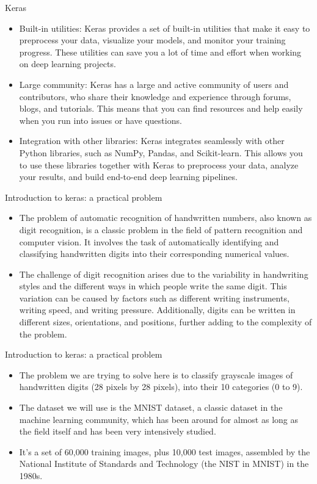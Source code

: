 \documentclass[11pt]{beamer}
\begin{document}
\begin{frame}{Keras}
\begin{itemize}
\item Built-in utilities: Keras provides a set of built-in utilities that make it easy to preprocess your data, visualize your models, and monitor your training progress. These utilities can save you a lot of time and effort when working on deep learning projects.

\item Large community: Keras has a large and active community of users and contributors, who share their knowledge and experience through forums, blogs, and tutorials. This means that you can find resources and help easily when you run into issues or have questions.

\item Integration with other libraries: Keras integrates seamlessly with other Python libraries, such as NumPy, Pandas, and Scikit-learn. This allows you to use these libraries together with Keras to preprocess your data, analyze your results, and build end-to-end deep learning pipelines.
\end{itemize}
\end{frame}
\begin{frame}{Introduction to keras: a practical problem}
\begin{itemize}
\item The problem of automatic recognition of handwritten numbers, also known as digit recognition, is a classic problem in the field of pattern recognition and computer vision. It involves the task of automatically identifying and classifying handwritten digits into their corresponding numerical values.
\item The challenge of digit recognition arises due to the variability in handwriting styles and the different ways in which people write the same digit. This variation can be caused by factors such as different writing instruments, writing speed, and writing pressure. Additionally, digits can be written in different sizes, orientations, and positions, further adding to the complexity of the problem.
\end{itemize}
\end{frame}
\begin{frame}{Introduction to keras: a practical problem}

	\begin{itemize}
	\item The problem we are trying to solve here is to classify grayscale images of handwritten digits (28 pixels by 28 pixels), into their 10 categories (0 to 9). 
	\item The dataset we will use is the MNIST dataset, a classic dataset in the machine learning community, which has been around for almost as long as the field itself and has been very intensively studied. 
	\item It's a set of 60,000 training images, plus 10,000 test images, assembled by the National Institute of Standards and Technology (the NIST in MNIST) in the 1980s. 
	\end{itemize}
\end{frame}
\end{document}
